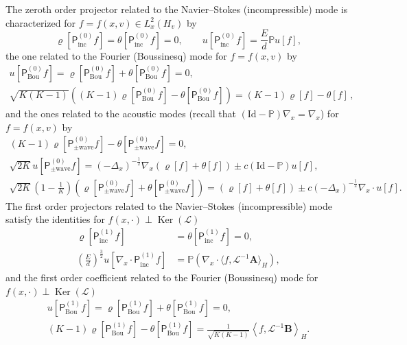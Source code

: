 \documentclass[10pt]{amsart}
\theoremstyle{definition}\newtheorem{defi}[theo]{Definition}\newtheorem{rema}[theo]{Remark}\newtheorem{exam}[theo]{Example}\newtheorem{exem}[theo]{Example}\newtheorem{nota}[theo]{Notation}
\DeclareMathOperator{\nul}{Ker}
\newcommand{\Id}{\mathrm{Id}}
\newcommand{\Wave}{\mathrm{wave}}
\newcommand{\Inc}{\mathrm{inc}}
\newcommand{\Bou}{\mathrm{Bou}}
\newcommand{\BurA}{{\mathbf{A}}}
\newcommand{\BurB}{{\mathbf{B}}}
\newcommand{\bbP}{\mathbb{P}}
\newcommand{\LL}{\mathcal{L}}
\newcommand{\PP}{\mathsf{P}}
\newcommand{\Ss}{H}
\newcommand{\la}{\langle}
\newcommand{\ra}{\rangle}
\newcommand{\lla}{\left\langle}
\newcommand{\rra}{\right\rangle}
\begin{document}
\begin{prop}\label{prop:macro_representation_spectral}
The zeroth order projector related to the Navier--Stokes (incompressible) mode is characterized for $f=f(x,v) \in L^2_x(\Ss_v)$ by
\[
\varrho\left[\PP^{(0)}_\Inc f \right] = \theta\left[\PP^{(0)}_\Inc f \right] = 0, \qquad u \left[\PP^{(0)}_\Inc f \right] = \frac{E}{d} \bbP u[f],
\]
the one related to the Fourier (Boussinesq) mode for $f=f(x, v)$ by
\begin{gather*}
u\left[\PP^{(0)}_\Bou f \right] =\varrho\left[\PP^{(0)}_\Bou f \right] + \theta\left[\PP^{(0)}_\Bou f \right] = 0,
\\
\sqrt{K(K-1)} \left((K-1) \varrho \left[\PP^{(0)}_\Bou f \right] - \theta \left[\PP^{(0)}_\Bou f \right] \right) = (K-1) \varrho[f] - \theta[f] \,,
\end{gather*}
and the ones related to the acoustic modes (recall that $(\Id - \bbP) \nabla_x = \nabla_x $) for $f=f(x, v)$ by
\begin{gather*}
(K-1) \varrho\left[\PP^{(0)}_{\pm \Wave} f \right] - \theta\left[\PP^{(0)}_{\pm \Wave} f \right] = 0,
\\
\sqrt{2K} u\left[\PP^{(0)}_{\pm \Wave} f \right] = (- \Delta_x)^{-\frac{1}{2}} \nabla_x \left(\varrho[f] + \theta[f]\right) \pm c \left(\Id - \bbP \right) u[f],
\\
\sqrt{2K} \left(1 - \frac{1}{K} \right)\left(\varrho \left[\PP^{(0)}_{\pm \Wave} f \right] + \theta \left[\PP^{(0)}_{\pm \Wave} f \right] \right) = (\varrho[f] + \theta[f]) \pm c (- \Delta_x)^{-\frac{1}{2}} \nabla_x \cdot u[f].
\end{gather*}
The first order projectors related to the Navier--Stokes (incompressible) mode satisfy the identities for $f(x, \cdot) \perp \nul(\LL)$
\begin{align*}
\varrho\left[\PP^{(1)}_\Inc f \right] &= \theta\left[\PP^{(1)}_\Inc f \right] = 0,
\\
\left(\frac{E}{d} \right)^{\frac{3}{2}} u \left[\nabla_x \cdot \PP^{(1)}_\Inc f \right] &= \bbP \left(\nabla_x \cdot \la f, \LL^{-1}\BurA \ra_{\Ss} \right),
\end{align*}
and the first order coefficient related to the Fourier (Boussinesq) mode for $f(x, \cdot) \perp \nul(\LL)$
\begin{gather*}
u\left[\PP^{(1)}_\Bou f \right] = \varrho\left[\PP^{(1)}_\Bou f \right] + \theta\left[\PP^{(1)}_\Bou f \right] = 0,
\\
(K-1) \varrho\left[\PP^{(1)}_\Bou f \right] - \theta\left[\PP^{(1)}_\Bou f \right] = \frac{1}{\sqrt{K(K-1)}}\lla f, \LL^{-1}\BurB \rra_{\Ss}.
\end{gather*}
\end{prop}
\end{document}

